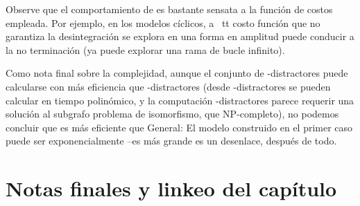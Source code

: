 Observe que el comportamiento de  es bastante sensata
a la funci\'on de costos empleada. Por ejemplo, en los modelos c\'iclicos,
a {\ tt} costo funci\'on que no garantiza la desintegraci\'on se explora en una
forma en amplitud puede conducir a la no terminaci\'on (ya
 puede explorar una rama de bucle infinito).


%


Como nota final sobre la complejidad, aunque el conjunto de \EL-distractores
puede calcularse con m\'as eficiencia que \EPFOL-distractores (desde
\EL-distractores se pueden calcular en tiempo polin\'omico, y la computaci\'on
\EPFOL-distractores parece requerir una soluci\'on al subgrafo
problema de isomorfismo, que NP-completo), no podemos concluir que
 es m\'as eficiente que 
General: El modelo construido en el primer caso puede ser exponencialmente
--es m\'as grande es un desenlace, despu\'es de todo. %


\section{Notas finales y linkeo del cap\'itulo}
\label{sec:notasFinales}
